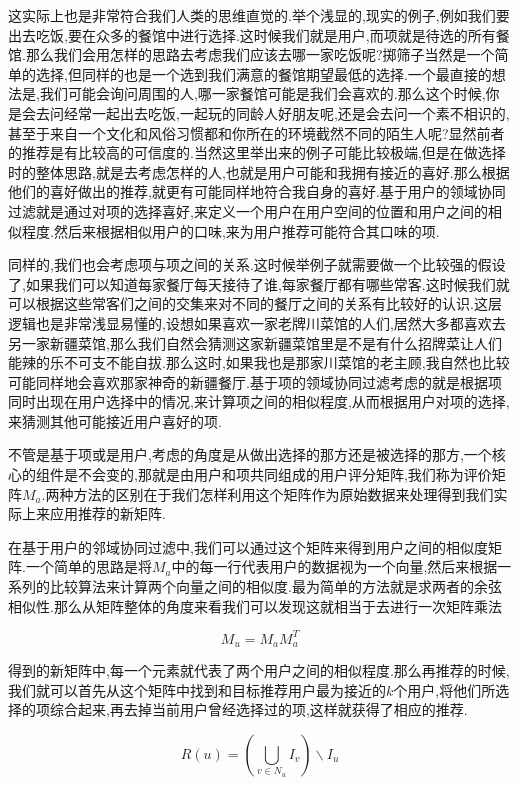 这实际上也是非常符合我们人类的思维直觉的.举个浅显的,现实的例子,例如我们要出去吃饭,要在众多的餐馆中进行选择.这时候我们就是用户,而项就是待选的所有餐馆.那么我们会用怎样的思路去考虑我们应该去哪一家吃饭呢?掷筛子当然是一个简单的选择,但同样的也是一个选到我们满意的餐馆期望最低的选择.一个最直接的想法是,我们可能会询问周围的人,哪一家餐馆可能是我们会喜欢的.那么这个时候,你是会去问经常一起出去吃饭,一起玩的同龄人好朋友呢,还是会去问一个素不相识的,甚至于来自一个文化和风俗习惯都和你所在的环境截然不同的陌生人呢?显然前者的推荐是有比较高的可信度的.当然这里举出来的例子可能比较极端,但是在做选择时的整体思路,就是去考虑怎样的人,也就是用户可能和我拥有接近的喜好.那么根据他们的喜好做出的推荐,就更有可能同样地符合我自身的喜好.基于用户的领域协同过滤就是通过对项的选择喜好,来定义一个用户在用户空间的位置和用户之间的相似程度.然后来根据相似用户的口味,来为用户推荐可能符合其口味的项.

同样的,我们也会考虑项与项之间的关系.这时候举例子就需要做一个比较强的假设了,如果我们可以知道每家餐厅每天接待了谁,每家餐厅都有哪些常客.这时候我们就可以根据这些常客们之间的交集来对不同的餐厅之间的关系有比较好的认识.这层逻辑也是非常浅显易懂的,设想如果喜欢一家老牌川菜馆的人们,居然大多都喜欢去另一家新疆菜馆,那么我们自然会猜测这家新疆菜馆里是不是有什么招牌菜让人们能辣的乐不可支不能自拔.那么这时,如果我也是那家川菜馆的老主顾,我自然也比较可能同样地会喜欢那家神奇的新疆餐厅.基于项的领域协同过滤考虑的就是根据项同时出现在用户选择中的情况,来计算项之间的相似程度,从而根据用户对项的选择,来猜测其他可能接近用户喜好的项.

不管是基于项或是用户,考虑的角度是从做出选择的那方还是被选择的那方,一个核心的组件是不会变的,那就是由用户和项共同组成的用户评分矩阵,我们称为评价矩阵$M_a$.两种方法的区别在于我们怎样利用这个矩阵作为原始数据来处理得到我们实际上来应用推荐的新矩阵.

在基于用户的邻域协同过滤中,我们可以通过这个矩阵来得到用户之间的相似度矩阵.一个简单的思路是将$M_a$中的每一行代表用户的数据视为一个向量,然后来根据一系列的比较算法来计算两个向量之间的相似度.最为简单的方法就是求两者的余弦相似性.那么从矩阵整体的角度来看我们可以发现这就相当于去进行一次矩阵乘法

\begin{equation}
	M_u = M_a M_a^T
\end{equation}

得到的新矩阵中,每一个元素就代表了两个用户之间的相似程度.那么再推荐的时候,我们就可以首先从这个矩阵中找到和目标推荐用户最为接近的$k$个用户,将他们所选择的项综合起来,再去掉当前用户曾经选择过的项,这样就获得了相应的推荐.

\begin{equation}
	R(u) = \left(\bigcup_{v \in N_u} I_v\right) \backslash I_u
\end{equation}

